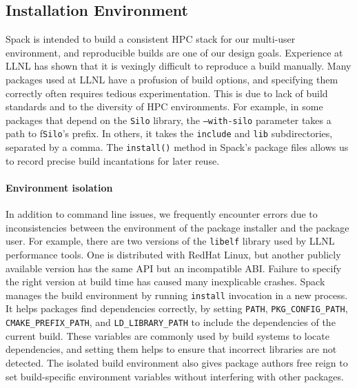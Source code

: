 

\subsection{Installation Environment}

Spack is intended to build a consistent HPC stack for our multi-user
environment, and reproducible builds are one of our design goals.
Experience at LLNL has shown that it is vexingly difficult to reproduce
a build manually.
%
Many packages used at LLNL have a profusion of build options, and specifying them 
correctly often requires tedious experimentation.  This is due to lack of
build standards and to the diversity of HPC environments.  
For example, in some packages that depend on the {\tt Silo} library,
the {\tt ---with-silo} parameter takes a path to f{\tt Silo}'s prefix.
In others, it takes the {\tt include} and {\tt lib} subdirectories,
separated by a comma.
The {\tt install()} method in Spack's package files allows us to record
precise build incantations for later reuse.

\paragraph{Environment isolation}
In addition to command line issues, we
frequently encounter errors due to inconsistencies between the environment of
the package installer and the package user.
%
For example, there are two versions of the {\tt libelf} library used by
LLNL performance tools. One is distributed with RedHat Linux, but another
publicly available version has the same API but an incompatible ABI.
Failure to specify the right version at build time has caused many
inexplicable crashes.
%
Spack manages the build environment by running {\tt install} invocation
in a new process.  It helps packages find dependencies 
correctly, by setting
{\tt PATH}, {\tt PKG\_CONFIG\_PATH}, {\tt CMAKE\_PREFIX\_PATH}, and
{\tt LD\_LIBRARY\_PATH} to include the dependencies of the current build.
These variables are commonly used by build systems to locate dependencies,
and setting them helps to ensure that incorrect libraries are not detected.
The isolated build environment also gives package authors 
free reign to set build-specific environment variables without interfering
with other packages.


